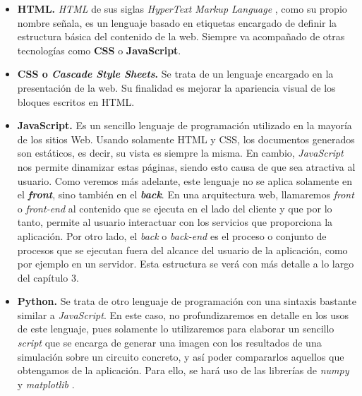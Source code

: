 \documentclass[../main.tex]{subfiles}
\begin{document}
\begin{itemize}
    \item \textbf{HTML. }\textit{HTML} de sus siglas \textit{HyperText Markup Language} \cite{htmldef}, como su propio nombre señala, es un lenguaje basado en etiquetas encargado de definir la estructura básica del contenido de la web. Siempre va acompañado de otras tecnologías como \textbf{CSS} o \textbf{JavaScript}.
    \item \textbf{CSS o \textit{Cascade Style Sheets}. } \cite{cssdef} Se trata de un lenguaje encargado en la presentación de la web. Su finalidad es mejorar la apariencia visual de los bloques escritos en HTML.
    \item \textbf{JavaScript. } Es un sencillo lenguaje de programación \cite{jsdef} utilizado en la mayoría de los sitios Web. Usando solamente HTML y CSS, los documentos generados son estáticos, es decir, su vista es siempre la misma. En cambio, \textit{JavaScript} nos permite dinamizar estas páginas, siendo esto causa de que sea atractiva al usuario. Como veremos más adelante, este lenguaje no se aplica solamente en el \textit{\textbf{front}}, sino también en el \textit{\textbf{back}}. En una arquitectura web, llamaremos \textit{front} o \textit{front-end} al contenido que se ejecuta en el lado del cliente y que por lo tanto, permite al usuario interactuar con los servicios que proporciona la aplicación. Por otro lado, el \textit{back} o \textit{back-end} es el proceso o conjunto de procesos que se ejecutan fuera del alcance del usuario de la aplicación, como por ejemplo en un servidor. Esta estructura se verá con más detalle a lo largo del capítulo 3.
    
    
    \item \textbf{Python. }Se trata de otro lenguaje de programación con una sintaxis bastante similar a \textit{JavaScript}. En este caso, no profundizaremos en detalle en los usos de este lenguaje, pues solamente lo utilizaremos para elaborar un sencillo \textit{script} que se encarga de generar una imagen con los resultados de una simulación sobre un circuito concreto, y así poder compararlos aquellos que obtengamos de la aplicación. Para ello, se hará uso de las librerías de \textit{numpy} \cite{numpy} y \textit{matplotlib} \cite{matplotlib}.
    
\end{itemize}
\end{document}
